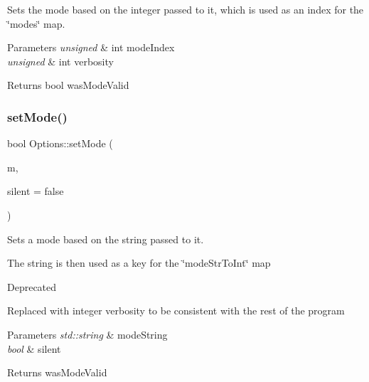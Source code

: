 Sets the mode based on the integer passed to it, which is used as an index for the \char`\"{}modes\char`\"{} map. 


\begin{DoxyParams}{Parameters}
{\em unsigned} & int mode\+Index \\
\hline
{\em unsigned} & int verbosity\\
\hline
\end{DoxyParams}
\begin{DoxyReturn}{Returns}
bool was\+Mode\+Valid 
\end{DoxyReturn}
\mbox{\label{classOptions_afb29fb62cc0ace88c866919c296ed34b}} 
\subsubsection{\texorpdfstring{setMode()}{setMode()}\hspace{0.1cm}{\footnotesize\ttfamily [3/6]}}
{\footnotesize\ttfamily bool Options\+::set\+Mode (\begin{DoxyParamCaption}\item[{std\+::string}]{m,  }\item[{bool}]{silent = {\ttfamily false} }\end{DoxyParamCaption})}



Sets a mode based on the string passed to it. 

The string is then used as a key for the \char`\"{}mode\+Str\+To\+Int\char`\"{} map

\begin{DoxyRefDesc}{Deprecated}
\item[\mbox{\hyperlink{deprecated__deprecated000004}{Deprecated}}]Replaced with integer verbosity to be consistent with the rest of the program\end{DoxyRefDesc}



\begin{DoxyParams}{Parameters}
{\em std\+::string} & mode\+String \\
\hline
{\em bool} & silent\\
\hline
\end{DoxyParams}
\begin{DoxyReturn}{Returns}
was\+Mode\+Valid 
\end{DoxyReturn}
\mbox{\label{classOptions_af474b43c0dd7e5342ca195a7912a7683}} 

